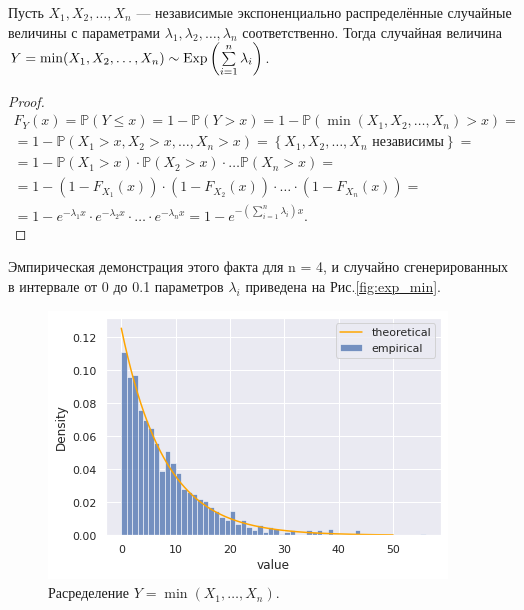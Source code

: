 \begin{statement}
	Пусть $ X_1,X_2,\ldots,X_n $ --- независимые экспоненциально распределённые
	 случайные величины с параметрами $ \lambda_1,\lambda_2,\ldots,\lambda_n $
	 соответственно. Тогда случайная величина $ Y = \min(X_1, X_2, \dots, X_n)
	 \sim \operatorname{\mathrm{Exp}} \left( \sum\limits_{i = 1}^n \lambda_i \right) $.
\end{statement}
\begin{proof}
	\begin{multline*}
		F_Y(x) = \mathbb{P}(Y \le x) = 1 - \mathbb{P} (Y > x) = 1 - \mathbb{P}
		 (\min(X_1, X_2, \dots, X_n) > x) = \\
		= 1 - \mathbb{P}(X_1 > x, X_2 > x, \dots, X_n > x) = \left\{ X_1, X_2,
		 \dots, X_n \text{ независимы} \right\} = \\
		= 1 - \mathbb{P} (X_1 > x) \cdot \mathbb{P} (X_2 > x) \cdot \dots
		 \mathbb{P} (X_n > x) = \\
		= 1 - \left( 1 - F_{X_1}(x) \right) \cdot \left( 1 - F_{X_2}(x) \right) 
		\cdot \dots \cdot \left( 1 - F_{X_n}(x) \right) = \\
		= 1 - e^{-\lambda_1 x} \cdot e^{-\lambda_2 x} \cdot \dots \cdot
		 e^{-\lambda_n x} = 1 - e^{-\left( \sum_{i=1}^n \lambda_i \right) x}.
	\end{multline*}
\end{proof}
Эмпирическая демонстрация этого факта для n = 4, и случайно сгенерированных
 в интервале от 0 до 0.1 параметров $\lambda_i $ приведена на Рис.\eqref{fig:exp_min}.
\begin{figure}[ht]
	\centering
	\includegraphics[width = 0.7\linewidth]{"./resources/exp_min.png"}
	\caption{Расределение $ Y = \min(X_1, \dots, X_n) $.}
    \label{fig:exp_min}
\end{figure}


